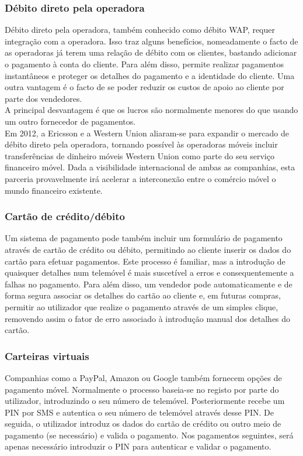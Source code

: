 \subsubsection{Débito direto pela operadora}

Débito direto pela operadora, também conhecido como débito WAP, requer integração com a operadora. Isso traz alguns benefícios, nomeadamente o facto de as operadoras já terem uma relação de débito com os clientes, bastando adicionar o pagamento à conta do cliente. Para além disso, permite realizar pagamentos instantâneos e proteger os detalhes do pagamento e a identidade do cliente. Uma outra vantagem é o facto de se poder reduzir os custos de apoio ao cliente por parte dos vendedores.
\\A principal desvantagem é que os lucros são normalmente menores do que usando um outro fornecedor de pagamentos.
\\Em 2012, a Ericsson e a Western Union aliaram-se para expandir o mercado de débito direto pela operadora, tornando possível às operadoras móveis incluir transferências de dinheiro móveis Western Union como parte do seu serviço financeiro móvel. Dada a visibilidade internacional de ambas as companhias, esta parceria provavelmente irá acelerar a interconexão entre o comércio móvel o mundo financeiro existente.\cite{ericsson}

\subsubsection{Cartão de crédito/débito}
Um sistema de pagamento \web pode também incluir um formulário de pagamento através de cartão de crédito ou débito, permitindo ao cliente inserir os dados do cartão para efetuar pagamentos. Este processo é familiar, mas a introdução de quaisquer detalhes num telemóvel é mais suscetível a erros e consequentemente a falhas no pagamento. Para além disso, um vendedor pode automaticamente e de forma segura associar os detalhes do cartão ao cliente e, em futuras compras, permitir ao utilizador que realize o pagamento através de um simples clique, removendo assim o fator de erro associado à introdução manual dos detalhes do cartão.

\subsubsection{Carteiras virtuais}
Companhias como a PayPal, Amazon ou Google também fornecem opções de pagamento móvel. Normalmente o processo baseia-se no registo por parte do utilizador, introduzindo o seu número de telemóvel. Posteriormente recebe um PIN por SMS e autentica o seu número de telemóvel através desse PIN. De seguida, o utilizador introduz os dados do cartão de crédito ou outro meio de pagamento (se necessário) e valida o pagamento. Nos pagamentos seguintes, será apenas necessário introduzir o PIN para autenticar e validar o pagamento.

